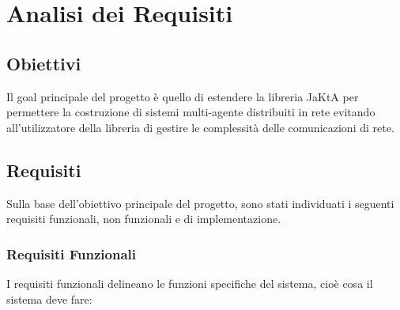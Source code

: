 \section{Analisi dei Requisiti}

%
%

%

\subsection{Obiettivi}

Il goal principale del progetto è quello di estendere la libreria JaKtA per permettere la costruzione di sistemi multi-agente distribuiti in rete evitando all'utilizzatore della libreria di gestire le complessità delle comunicazioni di rete.

\subsection{Requisiti}
Sulla base dell'obiettivo principale del progetto, sono stati individuati i seguenti requisiti funzionali, non funzionali e di implementazione.

\subsubsection{Requisiti Funzionali}
I requisiti funzionali delineano le funzioni specifiche del sistema, cioè cosa il sistema deve fare:

